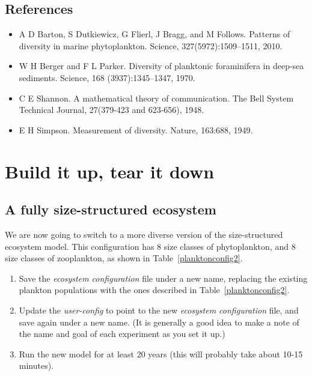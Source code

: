 \documentclass[11pt,fleqn]{book} %
\begin{document}

\subsection*{References} 

\begin{itemize}[noitemsep]
\item A D Barton, S Dutkiewicz, G Flierl, J Bragg, and M Follows. Patterns of diversity in marine phytoplankton. Science, 327(5972):1509–1511, 2010.
\item W H Berger and F L Parker. Diversity of planktonic foraminifera in deep-sea sediments. Science, 168 (3937):1345–1347, 1970.
\item C E Shannon. A mathematical theory of communication. The Bell System Technical Journal, 27(379-423 and 623-656), 1948.
\item E H Simpson. Measurement of diversity. Nature, 163:688, 1949.
\end{itemize}


\newpage


\section{Build it up, tear it down}


\subsection{A fully size-structured  ecosystem} We are now going to switch to a more diverse version of the size-structured ecosystem model. This configuration has 8 size classes of phytoplankton, and 8 size classes of zooplankton, as shown in Table~\ref{planktonconfig2}.

\vspace{2mm}
\begin{enumerate}[noitemsep]

\item Save the \textit{ecosystem configuration} file under a new name, replacing the existing plankton populations with the ones described in Table~\ref{planktonconfig2}.

\item Update the \textit{user-config} to point to the new \textit{ecosystem configuration} file, and save again under a new name. (It is generally a good idea to make a note of the name and goal of each experiment as you set it up.)

\item Run the new model for at least 20 years (this will probably take about 10-15 minutes). 

\end{enumerate}
\vspace{2mm}
\end{document}
